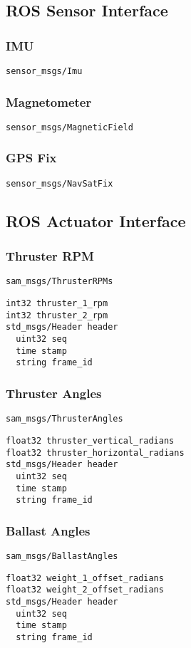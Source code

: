 \documentclass[9pt,technote]{IEEEtran} %
\begin{document}
\subsection{ROS Sensor Interface}


\subsubsection{IMU} \texttt{sensor\_msgs/Imu}
\subsubsection{Magnetometer} \texttt{sensor\_msgs/MagneticField}
\subsubsection{GPS Fix} \texttt{sensor\_msgs/NavSatFix}

\subsection{ROS Actuator Interface}

\subsubsection{Thruster RPM} \texttt{sam\_msgs/ThrusterRPMs}
\begin{scriptsize}
\begin{verbatim}
int32 thruster_1_rpm
int32 thruster_2_rpm
std_msgs/Header header
  uint32 seq
  time stamp
  string frame_id
\end{verbatim}
\end{scriptsize}

\subsubsection{Thruster Angles} \texttt{sam\_msgs/ThrusterAngles}
\begin{scriptsize}
\begin{verbatim}
float32 thruster_vertical_radians
float32 thruster_horizontal_radians
std_msgs/Header header
  uint32 seq
  time stamp
  string frame_id
\end{verbatim}
\end{scriptsize}
\subsubsection{Ballast Angles} \texttt{sam\_msgs/BallastAngles}
\begin{scriptsize}
\begin{verbatim}
float32 weight_1_offset_radians
float32 weight_2_offset_radians
std_msgs/Header header
  uint32 seq
  time stamp
  string frame_id
\end{verbatim}
\end{scriptsize}
\end{document}
